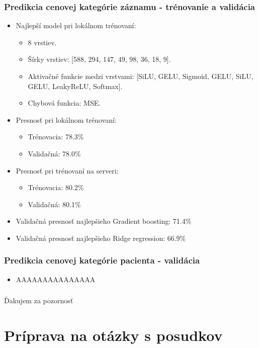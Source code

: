 \documentclass[slovak,10pt]{beamer}
\begin{document}
\begin{frame}
	\frametitle{Predikcia cenovej kategórie záznamu - trénovanie a validácia}
	\begin{itemize}
		\item<1> Najlepší model pri lokálnom trénovaní:
		\begin{itemize}
			\item<1> 8 vrstiev.
			\item<1> Šírky vrstiev: [588, 294, 147, 49, 98, 36, 18, 9].
			\item<1> Aktivačné funkcie medzi vrstvami: [SiLU, GELU, Sigmoid, GELU, SiLU, GELU, LeakyReLU, Softmax].
			\item<1> Chybová funkcia: MSE.
		\end{itemize}
		
		\item<1> Presnosť pri lokálnom trénovaní: 
		\begin{itemize}
			\item<1> Trénovacia: 78.3\%
			\item<1> Validačná: 78.0\%
		\end{itemize}
		\item<1> Presnosť pri trénovaní na serveri: 
		\begin{itemize}
			\item<1> Trénovacia: 80.2\%
			\item<1> Validačná: 80.1\%
		\end{itemize}
		\item<1> Validačná presnosť najlepšieho Gradient boosting: 71.4\%
		\item<1> Validačná presnosť najlepšieho Ridge regression: 66.9\%
	\end{itemize}
	
\end{frame}

\begin{frame}
	\frametitle{Predikcia cenovej kategórie pacienta - validácia}
	\begin{itemize}
		\item<1> AAAAAAAAAAAAAAA
	\end{itemize}
	
\end{frame}


\begin{frame}
	\frametitle{}
	
	\large{Ďakujem za pozornosť}
\end{frame}

\section{Príprava na otázky s posudkov}
\end{document}
